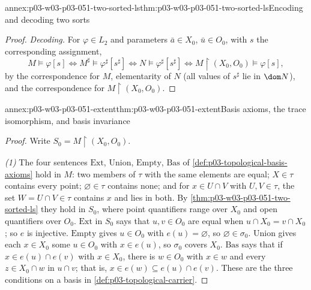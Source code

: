 \begin{annexitem}{annex:p03-w03-p03-051-two-sorted-ls}{thm:p03-w03-p03-051-two-sorted-ls}{Encoding and decoding two sorts}
\begin{proof}
\emph{Decoding.} For \(\varphi\in L_2\) and parameters
\(\bar a\in X_0\), \(\bar u\in O_0\), with \(s\) the corresponding
assignment,
\[
 M\models\varphi[s]
 \iff M^\sharp\models\varphi^\sharp[s^\sharp]
 \iff N\models\varphi^\sharp[s^\sharp]
 \iff M\restriction(X_0,O_0)\models\varphi[s],
\]
by the correspondence for \(M\), elementarity of \(N\) (all values of
\(s^\sharp\) lie in \(\dom N\)), and the correspondence for
\(M\restriction(X_0,O_0)\).
\end{proof}
\end{annexitem}

\begin{annexitem}{annex:p03-w03-p03-051-extent}{thm:p03-w03-p03-051-extent}{Basis axioms, the trace isomorphism, and basis invariance}
\begin{proof}
Write \(S_0=M\restriction(X_0,O_0)\).

\emph{(1)} The four sentences \(\mathrm{Ext}\), \(\mathrm{Union}\),
\(\mathrm{Empty}\), \(\mathrm{Bas}\) of
\cref{def:p03-topological-basis-axioms} hold in \(M\): two members of
\(\tau\) with the same elements are equal; \(X\in\tau\) contains every
point; \(\varnothing\in\tau\) contains none; and for \(x\in U\cap V\) with
\(U,V\in\tau\), the set \(W=U\cap V\in\tau\) contains \(x\) and lies in
both. By \cref{thm:p03-w03-p03-051-two-sorted-ls} they hold in \(S_0\),
where point quantifiers range over \(X_0\) and open quantifiers over
\(O_0\). \(\mathrm{Ext}\) in \(S_0\) says that \(u,v\in O_0\) are equal when
\(u\cap X_0=v\cap X_0\); so \(e\) is injective. \(\mathrm{Empty}\) gives
\(u\in O_0\) with \(e(u)=\varnothing\), so \(\varnothing\in\sigma_0\).
\(\mathrm{Union}\) gives each \(x\in X_0\) some \(u\in O_0\) with
\(x\in e(u)\), so \(\sigma_0\) covers \(X_0\). \(\mathrm{Bas}\) says that if
\(x\in e(u)\cap e(v)\) with \(x\in X_0\), there is \(w\in O_0\) with
\(x\in w\) and every \(z\in X_0\cap w\) in \(u\cap v\); that is,
\(x\in e(w)\subseteq e(u)\cap e(v)\). These are the three conditions on a
basis in \cref{def:p03-topological-carrier}.


\end{proof}
\end{annexitem}
